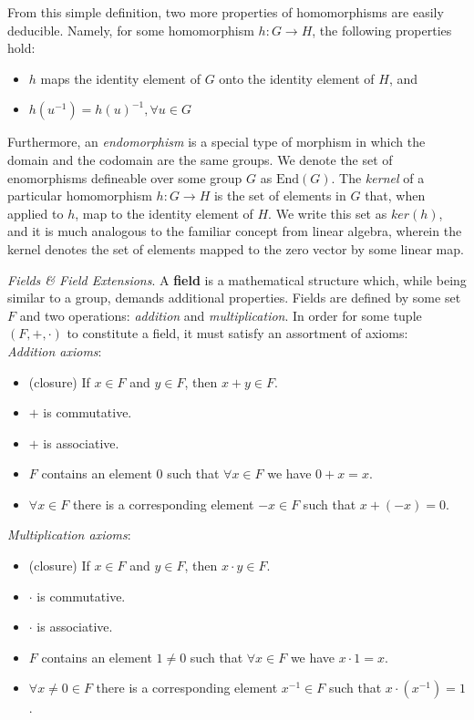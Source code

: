 From this simple definition, two more properties of homomorphisms are easily deducible. Namely, for some homomorphism $h: G \rightarrow H$, the following properties hold:
\begin{itemize}
\item $h$ maps the identity element of $G$ onto the identity element of $H$, and
\item $h(u^{-1}) = h(u)^{-1}, \forall u \in G$
\end{itemize}

Furthermore, an \emph{endomorphism} is a special type of morphism in which the domain and the codomain are the same groups. We denote the set of enomorphisms defineable over some group $G$ as $\text{End}(G)$.
The \emph{kernel} of a particular homomorphism $h: G \rightarrow H$  is the set of elements in $G$ that, when applied to $h$, map to the identity element of $H$. We write this set as $ker(h)$, and it is much analogous to the familiar concept from linear algebra, wherein the kernel denotes the set of elements mapped to the zero vector by some linear map.
\vspace{10mm}

\noindent
\emph{Fields \& Field Extensions}. A \textbf{field} is a mathematical structure which, while being similar to a group, demands additional properties. Fields are defined by some set $F$ and two operations: \emph{addition} and \emph{multiplication}. In order for some tuple $(F,+,\cdot)$ to constitute a field, it must satisfy an assortment of axioms:\\

\emph{Addition axioms}:
\begin{itemize}
\item (closure) If $x \in F$ and $y \in F$, then $x + y \in F$.
\item $+$ is commutative.
\item $+$ is associative.
\item $F$ contains an element 0 such that $\forall x \in F$ we have $0 + x = x$.
\item $\forall x \in F$ there is a corresponding element $-x \in F$ such that $x + (-x) = 0$.
\end{itemize}

\emph{Multiplication axioms}:
\begin{itemize}
\item (closure) If $x \in F$ and $y \in F$, then $x \cdot y \in F$.
\item $\cdot$ is commutative.
\item $\cdot$ is associative.
\item $F$ contains an element $1 \neq 0$ such that $\forall x \in F$ we have $x \cdot 1 = x$.
\item $\forall x \neq 0 \in F$ there is a corresponding element $x^{-1} \in F$ such that $x \cdot (x^{-1}) = 1$.
\end{itemize}

